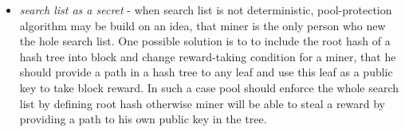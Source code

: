 \begin{itemize}
    \item{\em search list as a secret} - when search list is not deterministic,
    pool-protection algorithm may be build on
    an idea, that miner is the only person who new the hole search list.
    One possible solution is to to include the root hash
    of a hash tree into block and change reward-taking condition for a miner, that he should provide a path in
    a hash tree to any leaf and use this leaf as a public key to take block reward.
    In such a case pool should enforce the whole search list by defining root hash otherwise miner will be able to
    steal a reward by providing a path to his own public key in the tree.

\end{itemize}
